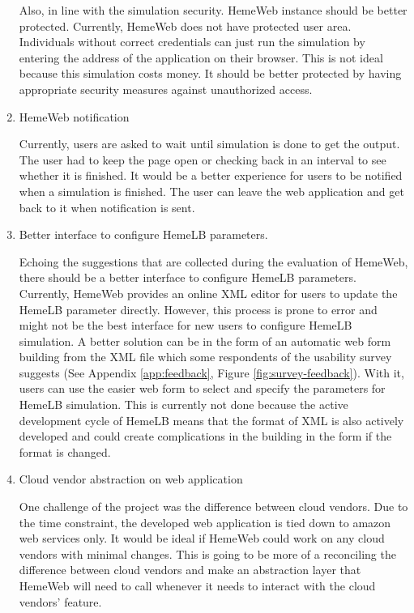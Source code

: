 \begin{enumerate}
  Also, in line with the simulation security. HemeWeb instance should be better protected. Currently, HemeWeb does not have protected user area. Individuals without correct credentials can just run the simulation by entering the address of the application on their browser. This is not ideal because this simulation costs money. It should be better protected by having appropriate security measures against unauthorized access.

   \item HemeWeb notification

   Currently, users are asked to wait until simulation is done to get the output. The user had to keep the page open or checking back in an interval to see whether it is finished. It would be a better experience for users to be notified when a simulation is finished. The user can leave the web application and get back to it when notification is sent.


   \item Better interface to configure HemeLB parameters. 

      Echoing the suggestions that are collected during the evaluation of HemeWeb, there should be a better interface to configure HemeLB parameters. Currently, HemeWeb provides an online XML editor for users to update the HemeLB parameter directly. However, this process is prone to error and might not be the best interface for new users to configure HemeLB simulation. A better solution can be in the form of an automatic web form building from the XML file which some respondents of the usability survey suggests (See Appendix \ref{app:feedback}, Figure \ref{fig:survey-feedback}). With it, users can use the easier web form to select and specify the parameters for HemeLB simulation. This is currently not done because the active development cycle of HemeLB means that the format of XML is also actively developed and could create complications in the building in the form if the format is changed.
    
    \item Cloud vendor abstraction on web application
    
    One challenge of the project was the difference between cloud vendors. Due to the time constraint, the developed web application is tied down to amazon web services only. It would be ideal if HemeWeb could work on any cloud vendors with minimal changes. This is going to be more of a reconciling the difference between cloud vendors and make an abstraction layer that HemeWeb will need to call whenever it needs to interact with the cloud vendors' feature.
    

\end{enumerate}

